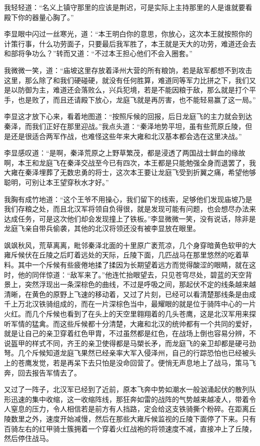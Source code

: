 我轻轻道：“名义上镇守那里的应该是荆迟，可是实际上主持那里的人是谁就要看殿下你的器量心胸了。”

李显眼中闪过一丝寒光，道：“本王明白你的意思，你放心，这次本王就按照你的计策行事，什么功劳面子，只要最后我军胜了，本王就是天大的功劳，难道还会去和部将争功么？”转而又道：“不过本王担心他们不会入圈套。”

我微微一笑，道：“庙坡这里存放着泽州大营的所有粮饷，若是敌军都想不到攻击这里，那么除了和我们硬碰硬，就没有任何胜算，难道同等军力比拼之下，我们又是以防御为主，难道还会落败么，兴兵犯境，若是不能因粮于敌，那么就是打个平手，也是败了，而且还请殿下放心，龙庭飞就是再厉害，也不能轻易赢了这一局。”

李显这才放下心来，看着地图道：“按照斥候的回报，后日龙庭飞的主力就会到达秦泽，而我们正好在那里迎战。”我点头道：“秦泽地势平坦，虽有些荒原丘陵，但是还是很适合两军作战，也难怪这些年来大雍和北汉基本都会选在这里决战。”

李显感叹道：“是啊，秦泽荒原之上野草繁茂，都是浸透了两国战士鲜血的缘故啊，本王和龙庭飞在秦泽交战至今已有四次，本王都是只能勉强全身而退罢了，我大雍在秦泽埋葬了无数忠勇的将士，这次本王要让龙庭飞受到折翼之痛，希望他够聪明，可别让本王望穿秋水才好。”

我胸有成竹地道：“这个王爷不用操心，我们留下的线索，足够他们发现庙坡乃是我们存粮之处，而且北汉军将领自负得很，就是发现可能有问题，也会想尽办法来达成任务，可是这次他们却会发现撞上了铁板。”李显微微一笑，没有说话，除非是龙庭飞亲自带兵偷袭，其他的北汉将领还没有被李显放在眼里。

飒飒秋风，荒草离离，毗邻秦泽北面的十里原广袤荒凉，几个身穿暗黄色软甲的大雍斥候伏在丘陵之后盯着远处的天际，丘陵下面，几匹战马在那里悠然的吃着草料。其中一个斥候有些疲倦地揉了揉因为长期望着远方而觉得酸涩的眼睛，就在这时，他的同伴惊道：“敌军来了。”他连忙抬眼望去，只见苍穹尽处，碧蓝的天空背景上，突然浮现出一条深棕色的曲线，不过是呼吸之间，那起伏不定的线条越来越清晰，在黄色的原野上飞速的移动着，又过了片刻，已经可以看清楚那线条是由成千上万北汉铁骑组成的，而在一片深棕色当中，最耀眼的就是位于骑阵中心的一片火红。而几个斥候也看到了在头上的天空里翱翔着的几头苍鹰，这是北汉军用来探听军情的猛禽。而这些斥候都十分清楚，大雍和北汉的统帅都有一个共同的爱好，就是让自己的亲卫穿着红色甲胄，不过虽然都是红色，在战场上倒也容易分辨，不说盔甲的样式不同，齐王的亲卫使得都是马槊长矛，而龙庭飞的亲卫却都是硬弓劲弩。几个斥候知道龙庭飞果然已经亲率大军入侵泽州，自己的行踪恐怕也已经被头上的苍鹰发觉，若是再呆下去只怕是没命回营了。便悄无声息地上了战马，策马飞奔，回去报告军情去了。

又过了一阵子，北汉军已经到了近前，原本飞奔中势如潮水一般汹涌起伏的散列队形迅速的集中收缩，这一收缩阵线，那狂奔如雷的战阵的气势越来越凌人，带着令人窒息的压力，令人相信若是前方有人挡路，定会给这支铁骑撕个粉碎。在距离丘陵数里之外，速度开始减慢，然后在那些大雍斥候监视的丘陵下面停了下来。只有百骑左右的红甲骑士簇拥着一个穿着火红战袍的将领速度不减，直接冲上了丘陵，然后停住战马。

